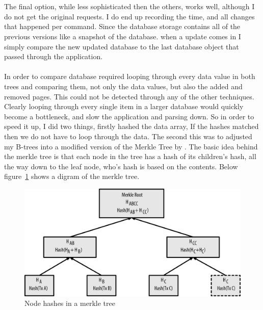 \\\\
The final option, while less sophisticated then the others, works well, although I do not get the original requests. I do end up recording the time, and all changes that happened per command. Since the database storage contains all of the previous versions like a snapshot of the database. when a update comes in I simply compare the new updated database to the last database object that passed through the application.
\\\\
In order to compare database required looping through every data value in both trees and comparing them, not only the data values, but also the added and removed pages. This could not be detected through any of the other techniques. Clearly looping through every single item in a larger database would quickly become a bottleneck, and slow the application and parsing down. So in order to speed it up, I did two things, firstly hashed the data array, If the hashes matched then we do not have to loop through the data. The second this was to adjusted my B-trees into a modified version of the Merkle Tree by \cite{merkletree}. The basic idea behind the merkle tree is that each node in the tree has a hash of its children’s hash, all the way down to the leaf node, who’s hash is based on the contents. Below figure~\ref{fig:merkle_tree} shows a digram of the merkle tree.

\begin{figure}[H]
	\centering
	\includegraphics[scale=1.0]{images/merkle_tree.png}
	\caption{Node hashes in a  merkle tree \citep{bitcoin}}
	\label{fig:merkle_tree}
\end{figure}

